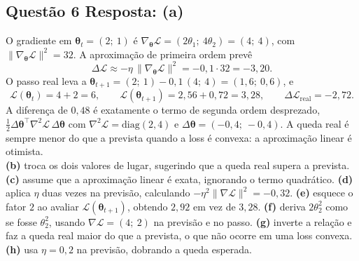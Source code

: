 \documentclass[11pt,a4paper]{article}
\begin{document}
\subsection*{Questão 6 \textemdash{} Resposta: (a)}
O gradiente em $\boldsymbol{\theta}_t = (2;\ 1)$ é $\nabla_{\boldsymbol{\theta}}\mathcal{L} = (2\theta_1;\ 4\theta_2) = (4;\ 4)$, com $\|\nabla_{\boldsymbol{\theta}}\mathcal{L}\|^2 = 32$. A aproximação de primeira ordem prevê
\[
\Delta\mathcal{L} \approx -\eta\,\|\nabla_{\boldsymbol{\theta}}\mathcal{L}\|^2 = -0{,}1 \cdot 32 = -3{,}20 .
\]
O passo real leva a $\boldsymbol{\theta}_{t+1} = (2;\ 1) - 0{,}1\,(4;\ 4) = (1{,}6;\ 0{,}6)$, e
\[
\mathcal{L}(\boldsymbol{\theta}_t) = 4 + 2 = 6, \qquad
\mathcal{L}(\boldsymbol{\theta}_{t+1}) = 2{,}56 + 0{,}72 = 3{,}28, \qquad
\Delta\mathcal{L}_{\text{real}} = -2{,}72 .
\]
A diferença de $0{,}48$ é exatamente o termo de segunda ordem desprezado, $\tfrac{1}{2}\Delta\boldsymbol{\theta}^{\top}\nabla^2\mathcal{L}\,\Delta\boldsymbol{\theta}$ com $\nabla^2\mathcal{L} = \mathrm{diag}(2, 4)$ e $\Delta\boldsymbol{\theta} = (-0{,}4;\ -0{,}4)$. A queda real é sempre menor do que a prevista quando a loss é convexa: a aproximação linear é otimista.\\
\textbf{(b)} troca os dois valores de lugar, sugerindo que a queda real supera a prevista.
\textbf{(c)} assume que a aproximação linear é exata, ignorando o termo quadrático.
\textbf{(d)} aplica $\eta$ duas vezes na previsão, calculando $-\eta^2\|\nabla\mathcal{L}\|^2 = -0{,}32$.
\textbf{(e)} esquece o fator $2$ ao avaliar $\mathcal{L}(\boldsymbol{\theta}_{t+1})$, obtendo $2{,}92$ em vez de $3{,}28$.
\textbf{(f)} deriva $2\theta_2^2$ como se fosse $\theta_2^2$, usando $\nabla\mathcal{L} = (4;\ 2)$ na previsão e no passo.
\textbf{(g)} inverte a relação e faz a queda real maior do que a prevista, o que não ocorre em uma loss convexa.
\textbf{(h)} usa $\eta = 0{,}2$ na previsão, dobrando a queda esperada.
\end{document}
